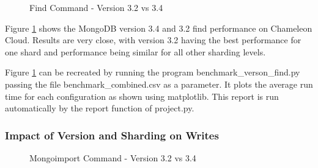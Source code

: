 \documentclass[9pt,twocolumn,twoside]{../../styles/osajnl}
\begin{document}
\begin{figure}[htbp]
\centering
{}
\caption{Find Command - Version 3.2 vs 3.4}
\label{fig:version-find}
\end{figure}

Figure \ref{fig:version-find} shows the MongoDB version 3.4 and 3.2 find performance on Chameleon Cloud.  Results are very close, with version 3.2 having the best performance for one shard and performance being similar for all other sharding levels.

Figure \ref{fig:version-find} can be recreated by running the program benchmark\_verson\_find.py passing the file benchmark\_combined.csv as a parameter.  It plots the average run time for each configuration as shown using matplotlib.  This report is run automatically by the report function of project.py.

\subsubsection{Impact of Version and Sharding on Writes}

\begin{figure}[htbp]
\centering
{}
\caption{Mongoimport Command - Version 3.2 vs 3.4}
\label{fig:version-import}
\end{figure}
\end{document}
